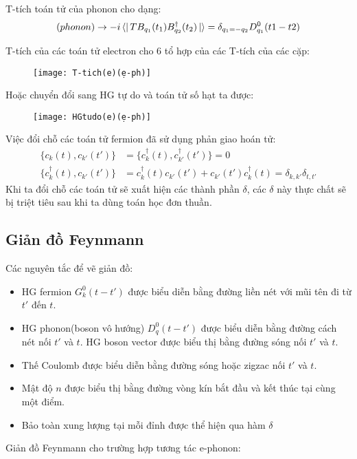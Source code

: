 \documentclass{report}
\begin{document}
T-tích toán tử của phonon cho dạng:
\begin{align}
	(phonon)\rightarrow-i \bra{}TB_{q_1}(t_1)B^{\dagger}_{q_2}(t_2)\ket{} = \delta_{q_1=-q_2} D^{0}_{q_1}(t1-t2)
\end{align}

T-tích của các toán tử electron cho 6 tổ hợp của các T-tích của các cặp:

\begin{figure}[h]
	\centering
	\texttt{[image: T-tich(e)(ẹ-ph)]}
	\label{fig:t-tichee-ph}
\end{figure}

Hoặc chuyển đổi sang HG tự do và toán tử số hạt ta được:

\begin{figure}[h]
	\centering
	\texttt{[image: HGtudo(e)(ẹ-ph)]}
	\label{fig:hgtudoee-ph}
\end{figure}

\noindent Việc đổi chỗ các toán tử fermion đã sử dụng phản giao hoán tử:
\begin{align}
	\{c_{k}(t),c_{k'}(t')\}           & = \{c^{\dagger}_{k}(t),c^{\dagger}_{k'}(t')\} = 0                                           \\
	\{c^{\dagger}_{k}(t),c_{k'}(t')\} & = c^{\dagger}_{k}(t)c_{k'}(t') + c_{k'}(t')c^{\dagger}_{k}(t) = \delta_{k,k'} \delta_{t,t'}
\end{align}
Khi ta đổi chỗ các toán tử sẽ xuất hiện các thành phần $\delta$, các $\delta$ này thực chất sẽ bị triệt tiêu sau khi ta dùng toán học đơn thuần.
\newpage
\subsection{Giản đồ Feynmann}
Các nguyên tắc để vẽ giản đồ:
\begin{itemize}
	\item HG fermion $G_k^0 (t-t')$ được biểu diễn bằng đường liền nét với mũi tên đi từ $t'$ đến $t$.
	\item HG phonon(boson vô hướng) $D_q^0 (t-t')$ được biểu diễn bằng đường cách nét nối $t'$ và $t$. HG boson vector được biểu thị bằng đường sóng nối  $t'$ và $t$.
	\item Thế Coulomb được biểu diễn bằng đường sóng hoặc zigzac nối $t'$ và $t$.
	\item Mật độ $n$ được biểu thị bằng đường vòng kín bắt đầu và kết thúc tại cùng một điểm.
	\item Bảo toàn xung lượng tại mỗi đỉnh được thể hiện qua hàm $\delta$
\end{itemize}
\newpage
Giản đồ Feynmann cho trường hợp tương tác e-phonon:
\end{document}
